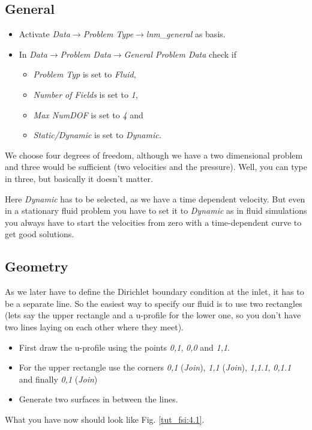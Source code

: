 \subsection{General}

\begin{itemize}
\item Activate \emph{Data$\to$Problem Type$\to$lnm\_general} as basis.
\item In \emph{Data$\to$Problem Data$\to$General Problem Data} check if 

\begin{itemize}
\item \emph{Problem Typ} is set to \emph{Fluid}, 
\item \emph{Number of Fields} is set to \emph{1}, 
\item \emph{Max NumDOF} is set to \emph{4} and 
\item \emph{Static/Dynamic} is set to \emph{Dynamic.}
\end{itemize}
\end{itemize}
We choose four degrees of freedom, although we have a two dimensional
problem and three would be sufficient (two velocities and the pressure).
Well, you can type in three, but basically it doesn't matter. 

Here \emph{Dynamic} has to be selected, as we have a time dependent
velocity. But even in a stationary fluid problem you have to set it
to \emph{Dynamic} as in fluid simulations you always have to start
the velocities from zero with a time-dependent curve to get good
solutions.


\subsection{Geometry}

As we later have to define the Dirichlet boundary condition at the
inlet, it has to be a separate line. So the easiest way to specify
our fluid is to use two rectangles (lets say the upper rectangle and
a u-profile for the lower one, so you don't have two lines laying
on each other where they meet).

\begin{itemize}
\item First draw the u-profile using the points \emph{0,1}, \emph{0,0} and \emph{1,1}.
\item For the upper rectangle use the corners \emph{0,1} (\emph{Join}), \emph{1,1} (\emph{Join}), \emph{1,1.1}, \emph{0,1.1} and finally \emph{0,1} (\emph{Join}) 
\item Generate two surfaces in between the lines. 
\end{itemize}
What you have now should look like Fig. \ref{tut_fsi:4.1}.

